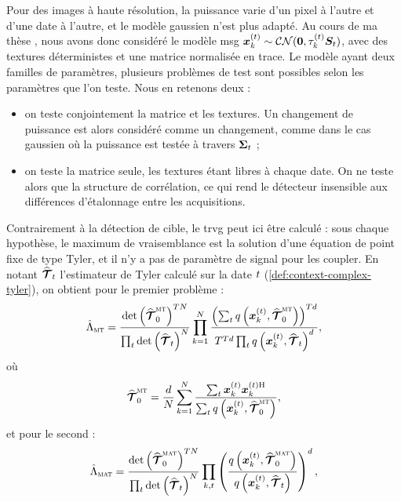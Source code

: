 Pour des images à haute résolution, la puissance varie d'un pixel à l'autre et d'une date à l'autre, et le modèle gaussien n'est plus adapté. Au cours de ma thèse , nous avons donc considéré le modèle msg $\boldsymbol{x}_k^{(t)}\sim\mathcal{CN}(\boldsymbol{0},\tau_k^{(t)}\boldsymbol{S}_t)$, avec des textures déterministes et une matrice normalisée en trace. Le modèle ayant deux familles de paramètres, plusieurs problèmes de test sont possibles selon les paramètres que l'on teste. Nous en retenons deux :
\begin{itemize}
  \item on teste conjointement la matrice et les textures. Un changement de puissance est alors considéré comme un changement, comme dans le cas gaussien où la puissance est testée à travers $\boldsymbol{\Sigma}_t$ ;
  \item on teste la matrice seule, les textures étant libres à chaque date. On ne teste alors que la structure de corrélation, ce qui rend le détecteur insensible aux différences d'étalonnage entre les acquisitions.
\end{itemize}
Contrairement à la détection de cible, le trvg peut ici être calculé : sous chaque hypothèse, le maximum de vraisemblance est la solution d'une équation de point fixe de type Tyler, et il n'y a pas de paramètre de signal pour les coupler. En notant $\widehat{\bm{\mathcal{T}}}_t$ l'estimateur de Tyler calculé sur la date $t$ (\cref{def:context-complex-tyler}), on obtient pour le premier problème :
\begin{equation}
  \hat{\Lambda}_{\textsc{mt}}
  =
  \frac{\operatorname{\operatorname{det}}\left(\widehat{\bm{\mathcal{T}}}_0^{\textsc{mt}}\right)^{TN}}{\prod_{t}\operatorname{\operatorname{det}}\left(\widehat{\bm{\mathcal{T}}}_t\right)^{N}}
  \prod_{k=1}^{N}
  \frac{\left(\sum_{t}q\left(\boldsymbol{x}_k^{(t)},\widehat{\bm{\mathcal{T}}}_0^{\textsc{mt}}\right)\right)^{Td}}
       {T^{Td}\prod_{t}q\left(\boldsymbol{x}_k^{(t)},\widehat{\bm{\mathcal{T}}}_t\right)^{d}},
  \label{eq:detection-cd-glrt-mt}
\end{equation}
où
\begin{equation*}
  \widehat{\bm{\mathcal{T}}}_0^{\textsc{mt}}
  =
  \frac{d}{N}\sum_{k=1}^{N}
  \frac{\sum_{t}\boldsymbol{x}_k^{(t)}\boldsymbol{x}_k^{(t)\mathrm{H}}}{\sum_{t}q\left(\boldsymbol{x}_k^{(t)},\widehat{\bm{\mathcal{T}}}_0^{\textsc{mt}}\right)},
\end{equation*}
et pour le second :
\begin{equation}
  \hat{\Lambda}_{\textsc{mat}}
  =
  \frac{\operatorname{\operatorname{det}}\left(\widehat{\bm{\mathcal{T}}}_0^{\textsc{mat}}\right)^{TN}}{\prod_{t}\operatorname{\operatorname{det}}\left(\widehat{\bm{\mathcal{T}}}_t\right)^{N}}
  \prod_{k,t}
  \left(\frac{q\left(\boldsymbol{x}_k^{(t)},\widehat{\bm{\mathcal{T}}}_0^{\textsc{mat}}\right)}{q\left(\boldsymbol{x}_k^{(t)},\widehat{\bm{\mathcal{T}}}_t\right)}\right)^{d},
  \label{eq:detection-cd-glrt-mat}
\end{equation}
